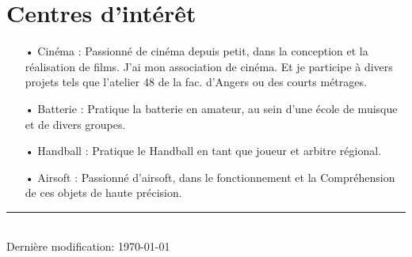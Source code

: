\documentclass[french]{article}
\begin{document}
\section*{Centres d'intérêt}
\begin{itemize}	
	\item[• Cinéma :] Passionné de cinéma depuis petit, dans la conception et la réalisation de films. J'ai mon association de cinéma. Et je participe à divers projets tels que l’atelier 48 de la fac. d’Angers ou des courts métrages.
	
	\item[• Batterie :] Pratique la batterie en amateur, au sein d'une école de muisque et de divers groupes.

	\item[• Handball :] Pratique le Handball en tant que joueur et arbitre régional.

	\item[• Airsoft :] Passionné d'airsoft, dans le fonctionnement et la Compréhension de ces objets de haute précision.

\end{itemize}

\centering
\rule{0.25\linewidth}{0.4pt}\\
\medskip
Dernière modification: \today
\end{document}
